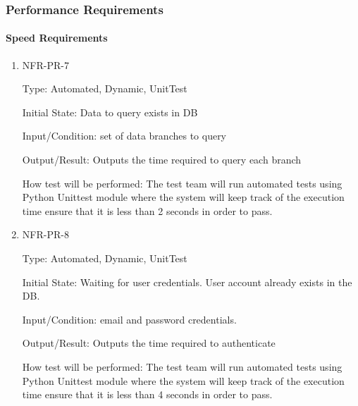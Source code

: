 \documentclass[12pt, titlepage]{article}
\begin{document}
\subsubsection{Performance Requirements}
\paragraph{Speed Requirements}
\begin{enumerate}
    \item{NFR-PR-7\\}
    
    Type: Automated, Dynamic, UnitTest
    
    Initial State: Data to query exists in DB
    					
    Input/Condition: set of data branches to query
    					
    Output/Result: Outputs the time required to query each branch
    					
    How test will be performed: The test team will run automated tests using Python Unittest module where the system will keep track of the execution time ensure that it is less than 2 seconds in order to pass.
    
    \item{NFR-PR-8\\}
    
    Type: Automated, Dynamic, UnitTest
    
    Initial State: Waiting for user credentials. User account already exists in the DB.
    					
    Input/Condition: email and password credentials.
    					
    Output/Result: Outputs the time required to authenticate
    					
    How test will be performed: The test team will run automated tests using Python Unittest module where the system will keep track of the execution time ensure that it is less than 4 seconds in order to pass.

\end{enumerate}
\end{document}
